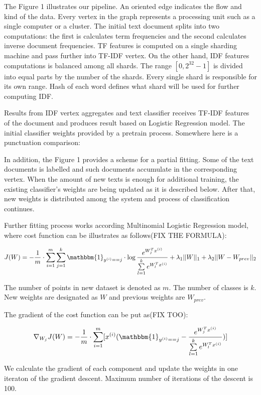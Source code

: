 The Figure 1 illustrates our pipeline. An oriented edge indicates the flow and kind of the data. Every vertex in the graph represents a processing unit such as a single computer or a cluster. The initial text document splits into two computations: the first is calculates term frequencies and the second calculates inverse document frequencies. TF features is computed on a single sharding machine and pass further into TF-IDF vertex. On the other hand, IDF features computations is balanced among all shards. The range $[0, 2^{32} - 1]$ is divided into equal parts by the number of the shards. Every single shard is responsible for its own range. Hash of each word defines what shard will be used for further computing IDF.

Results from IDF vertex aggregates and text classifier receives TF-IDF features of the document and produces result based on Logistic Regression model. The initial classifier weights provided by a pretrain process. Somewhere here is a punctuation comparison: \cite{tucker2003exploiting}

In addition, the Figure 1 provides a scheme for a partial fitting. Some of the text documents is labelled and such documents accumulate in the corresponding vertex. When the amount of new texts is enough for additional training, the existing classifier's weights are being updated as it is described below. After that, new weights is distributed among the system and process of classification continues. 

Further fitting process works according Multinomial Logistic Regression model, where cost function can be illustrates as follows(FIX THE FORMULA):

$$J(W) = -\frac{1}{m} \cdot \sum \limits_{i = 1}^{m} \sum \limits_{j = 1}^{k} \mathbbm{1}_{y^{(i)} == j} \cdot \log \frac{e^{W_{j}^Tx^{(i)}}}{\sum \limits_{l = 1}^{k}  e^{W_{l}^Tx^{(i)}}} + \lambda_1 ||W||_1 + \lambda_2 ||W - W_{prev}||_2 $$

The number of points in new dataset is denoted as $m$. The number of classes is $k$. New weights are designated as $W$ and previous weights are $W_{prev}$.

The gradient of the cost function can be put as(FIX TOO):

$$ \nabla_{W_j} J(W) = -\frac{1}{m} \cdot \sum \limits_{i = 1}^{m} [ x^{(i)} ( \mathbbm{1}_{y^{(i)} == j} - \frac{e^{W_{j}^Tx^{(i)}}}{\sum \limits_{l = 1}^{k}  e^{W_{l}^Tx^{(i)}}} ) ] $$

We calculate the gradient of each component and update the weights in one iteraton of the gradient descent. Maximum number of iterations of the descent is 100.